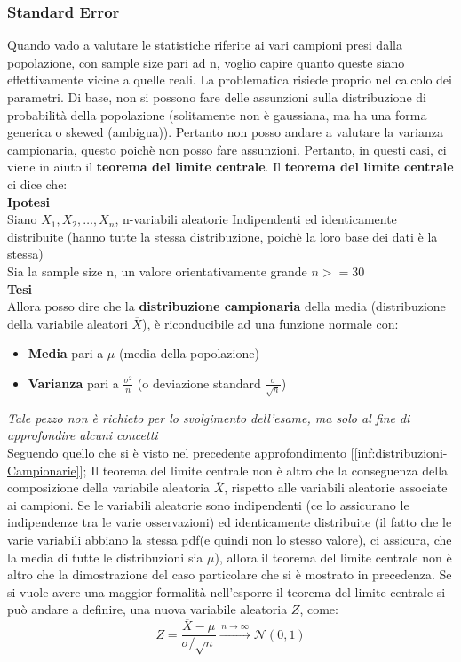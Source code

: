 \subsubsection{Standard Error}
Quando vado a valutare le statistiche riferite ai vari campioni presi dalla popolazione, con sample size pari ad n, voglio capire quanto queste siano effettivamente vicine a quelle reali. La problematica risiede proprio nel calcolo dei parametri. Di base, non si possono fare delle assunzioni sulla distribuzione di probabilità della popolazione (solitamente non è gaussiana, ma ha una forma generica o skewed (ambigua)). Pertanto non posso andare a valutare la varianza campionaria, questo poichè non posso fare assunzioni. Pertanto, in questi casi, ci viene in aiuto il \textbf{teorema del limite centrale}.
Il \textbf{teorema del limite centrale} ci dice che:
\\\textbf{Ipotesi}\\
Siano \(X_1, X_2, \dots, X_n\), n-variabili aleatorie Indipendenti ed identicamente distribuite (hanno tutte la stessa distribuzione, poichè la loro base dei dati è la stessa)
\\
Sia la sample size n, un valore orientativamente grande \(n>=30\)
\\
\textbf{Tesi}
\\
Allora posso dire che la \textbf{distribuzione campionaria} della media (distribuzione della variabile aleatori \(\overline{X}\)), è riconducibile ad una funzione normale con:
\begin{itemize}
    \item \textbf{Media} pari a \(\mu\) (media della popolazione)
    \item \textbf{Varianza} pari a \(\frac{\sigma^2}{n}\) (o deviazione standard \(\frac{\sigma}{\sqrt n}\))
\end{itemize}

\begin{info}
\textit{Tale pezzo non è richieto per lo svolgimento dell'esame, ma solo al fine di approfondire alcuni concetti}
\\
Seguendo quello che si è visto nel precedente approfondimento [\ref{inf:distribuzioni-Campionarie}]; Il teorema del limite centrale non è altro che la conseguenza della composizione della variabile aleatoria \(\overline{X}\), rispetto alle variabili aleatorie associate ai campioni. Se le variabili aleatorie sono indipendenti (ce lo assicurano le indipendenze tra le varie osservazioni) ed identicamente distribuite (il fatto che le varie variabili abbiano la stessa pdf(e quindi non lo stesso valore), ci assicura, che la  media di tutte le distribuzioni sia \(\mu\)), allora il teorema del limite centrale non è altro che la dimostrazione del caso particolare che si è mostrato in precedenza. Se si vuole avere una maggior formalità nell'esporre il teorema del limite centrale si può andare a definire, una nuova variabile aleatoria \(Z\), come:
\[
Z = \frac{\overline{X} - \mu}{\sigma / \sqrt{n}} 
\xrightarrow{\,n \to \infty\,} 
\mathcal{N}(0,1)
\]
\end{info}